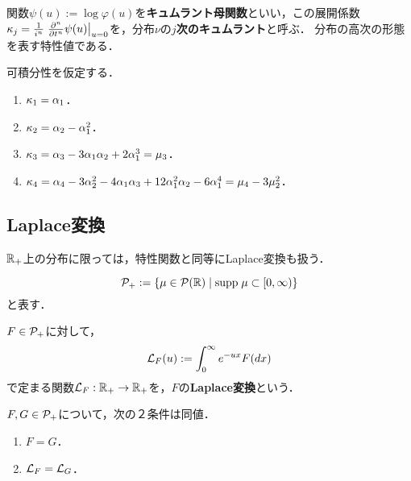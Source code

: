 \documentclass[uplatex,dvipdfmx]{jsreport}
\begin{document}
\begin{definition}[cuumulant]
    関数$\psi(u):=\log\varphi(u)$を\textbf{キュムラント母関数}といい，この展開係数$\kappa_j=\frac{1}{i^n}\left.\pp{^n}{t^n}\psi(u)\right|_{u=0}$を，分布$\nu$の\textbf{$j$次のキュムラント}と呼ぶ．
    分布の高次の形態を表す特性値である．
\end{definition}

\begin{proposition}[キュムラントの積率による表現]
    可積分性を仮定する．
    \begin{enumerate}
        \item $\kappa_1=\al_1$．
        \item $\kappa_2=\al_2-\al_1^2$．
        \item $\kappa_3=\al_3-3\al_1\al_2+2\al_1^3=\mu_3$．
        \item $\kappa_4=\al_4-3\al_2^2-4\al_1\al_3+12\al_1^2\al_2-6\al_1^4=\mu_4-3\mu_2^2$．
    \end{enumerate}
\end{proposition}

\subsection{Laplace変換}

\begin{tcolorbox}[colframe=ForestGreen, colback=ForestGreen!10!white,breakable,colbacktitle=ForestGreen!40!white,coltitle=black,fonttitle=\bfseries\sffamily,
title=]
    $\R_+$上の分布に限っては，特性関数と同等にLaplace変換も扱う．
\end{tcolorbox}

\begin{notation}
    \[\P_+:=\Brace{\mu\in\P(\R)\mid\supp\mu\subset[0,\infty)}\]
    と表す．
\end{notation}

\begin{definition}
    $F\in\P_+$に対して，
    \[\L_F(u):=\int^\infty_0e^{-ux}F(dx)\]
    で定まる関数$\L_F:\R_+\to\R_+$を，$F$の\textbf{Laplace変換}という．
\end{definition}

\begin{theorem}[一意性定理]
    $F,G\in\P_+$について，次の２条件は同値．
    \begin{enumerate}
        \item $F=G$．
        \item $\L_F=\L_G$．
    \end{enumerate}
\end{theorem}
\end{document}
